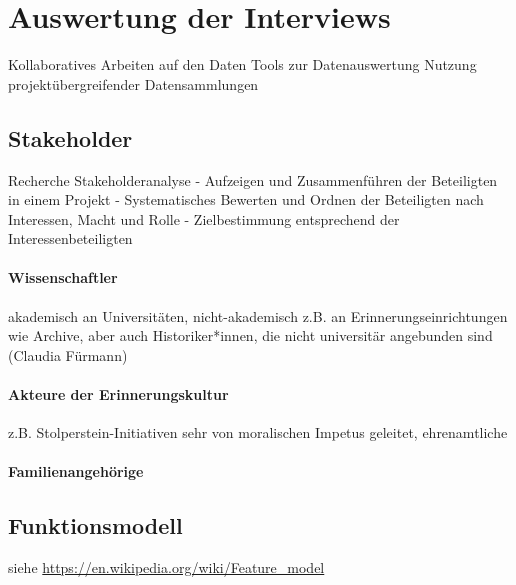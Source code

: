 \section{Auswertung der Interviews}
Kollaboratives Arbeiten auf den Daten
Tools zur Datenauswertung
Nutzung projektübergreifender Datensammlungen 

\subsection{Stakeholder}
Recherche
Stakeholderanalyse
- Aufzeigen und Zusammenführen der Beteiligten in einem Projekt
- Systematisches Bewerten und Ordnen der Beteiligten nach Interessen, Macht und Rolle
- Zielbestimmung entsprechend der Interessenbeteiligten

\paragraph{Wissenschaftler}

akademisch an Universitäten, nicht-akademisch z.B. an Erinnerungseinrichtungen wie Archive, aber auch Historiker*innen, die nicht universitär angebunden sind (Claudia Fürmann)


\paragraph{Akteure der Erinnerungskultur}

z.B. Stolperstein-Initiativen sehr von moralischen Impetus geleitet, ehrenamtliche

\paragraph{Familienangehörige}

\subsection{Funktionsmodell}

siehe \url{https://en.wikipedia.org/wiki/Feature_model}


